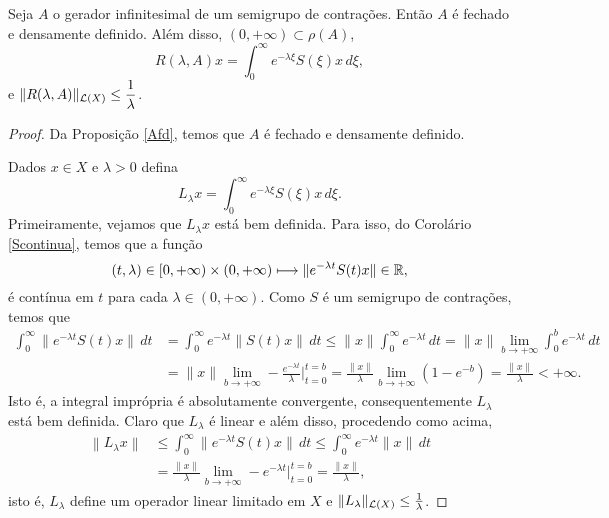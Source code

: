 \begin{lemma}
Seja $A$ o gerador infinitesimal de um semigrupo de contrações. Então $A$ é fechado e densamente definido. Além disso, $(0,+\infty)\subset \rho(A)$, 
\[R(\lambda,A)x=\displaystyle\int_0^\infty e^{-\lambda \xi}S(\xi)x\, d\xi,\] 
e $\|R(\lambda, A)\|_{\mathcal{L}(X)}\leq \displaystyle\frac{1}{\lambda}$.
\end{lemma}
\begin{proof} Da Proposição \ref{Afd}, temos que $A$ é fechado e densamente definido.

Dados $x\in X$ e $\lambda>0$ defina
\begin{equation*}
L_\lambda x =\int_0^\infty e^{-\lambda \xi}S(\xi)x\, d\xi.
\end{equation*}
Primeiramente, vejamos que $L_\lambda x$ {está bem definida.} 
Para isso, %
do Corolário \ref{Scontinua}, temos que a função
\begin{equation*}
(t,\lambda)\in [0,+\infty)\times (0,+\infty)\longmapsto
\| e^{-\lambda t}S(t)x\|\in  \mathbb{R},
\end{equation*}
é contínua em $t$ para cada $\lambda\in (0,+\infty)$. 
Como $S$ é um semigrupo de contrações, temos que
\begin{align*}
\int_0^\infty \|e^{-\lambda t}S(t)x\|\,dt& =
\int_0^\infty e^{-\lambda t}\|S(t)x\|\,dt\leq\|x\|
 \int_0^\infty e^{-\lambda t}\, dt =\|x\|\lim_{b\to +\infty} \int_0^b e^{-\lambda t}\, dt\\
& =\|x\|\lim_{b\to +\infty}-\frac{e^{-\lambda t}}{\lambda}\Big\vert_{t=0}^{t=b} =\frac{\|x\|}{\lambda}\lim_{b\to +\infty}\left(1-e^{-b}\right)=\frac{\|x\|}{\lambda}<+\infty.
\end{align*}
Isto é, a integral imprópria é absolutamente convergente, consequentemente $L_\lambda$ está bem definida. Claro que $L_\lambda$ é linear e além disso, procedendo como acima, 
\begin{align*}
\left\|L_\lambda x\right\|& \leq \int_0^\infty\|e^{-\lambda t}S(t)x\|\,dt\leq
\int_0^\infty e^{-\lambda t}\|x\|\,dt\\
& = \frac{\|x\|}{\lambda}\lim_{b\to +\infty}-e^{-\lambda t}\Big\vert_{t=0}^{t=b}
=\frac{\|x\|}{\lambda},
\end{align*}
isto é, $L_\lambda$ define um operador linear limitado em $X$ e 
$\|L_\lambda\|_{\mathcal{L}(X)}\leq \frac{1}{\lambda}$.


\end{proof}
